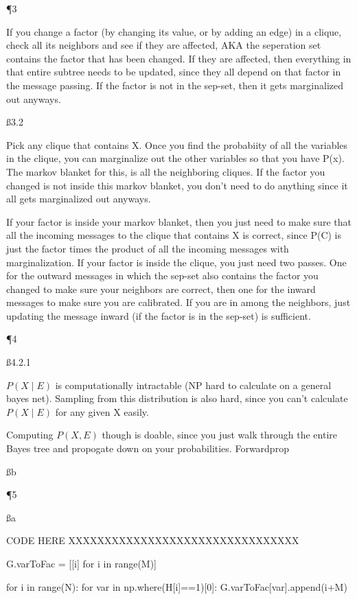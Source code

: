 \P 3

If you change a factor (by changing its value, or by adding an edge) in a clique, check all its neighbors and see if they are affected, AKA the seperation set contains the factor that has been changed. If they are affected, then everything in that entire subtree needs to be updated, since they all depend on that factor in the message passing. If the factor is not in the sep-set, then it gets marginalized out anyways.

\ss{3.2}

Pick any clique that contains X. Once you find the probabiity of all the variables in the clique, you can marginalize out the other variables so that you have P(x). The markov blanket for this, is all the neighboring cliques. If the factor you changed is not inside this markov blanket, you don't need to do anything since it all gets marginalized out anyways.

If your factor is inside your markov blanket, then you just need to make sure that all the incoming messages to the clique that contains X is correct, since P(C) is just the factor times the product of all the incoming messages with marginalization. If your factor is inside the clique, you just need two passes. One for the outward messages in which the sep-set also contains the factor you changed to make sure your neighbors are correct, then one for the inward messages to make sure you are calibrated. If you are in among the neighbors, just updating the message inward (if the factor is in the sep-set) is sufficient.

\P 4

\ss{4.2.1}

$P(X \mid E)$ is computationally intractable (NP hard to calculate on a general bayes net). Sampling from this distribution is also hard, since you can't calculate $P(X \mid E)$ for any given X easily.

Computing $P(X,E)$ though is doable, since you just walk through the entire Bayes tree and propogate down on your probabilities. Forwardprop

\ss b



\P 5

\ss a

CODE HERE XXXXXXXXXXXXXXXXXXXXXXXXXXXXXXXX

    G.varToFac = [[i] for i in range(M)]

    for i in range(N):
        for var in np.where(H[i]==1)[0]:
            G.varToFac[var].append(i+M)

